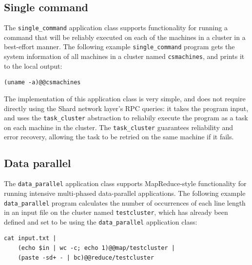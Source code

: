 \documentclass[oneside]{report}
\begin{document}
\subsection{Single command}

\begin{sloppypar}
  The \texttt{single\_command} application class supports functionality for running a command that will be reliably executed on each of the machines in a cluster in a best-effort manner. The following example \texttt{single\_command} program gets the system information of all machines in a cluster named \texttt{csmachines}, and prints it to the local output:
\end{sloppypar}

\begin{minipage}[c]{\textwidth-15pt}
  \begin{lstlisting}
(uname -a)@@csmachines 
\end{lstlisting}
  \smallskip
\end{minipage}

\begin{sloppypar}
  The implementation of this application class is very simple, and does not require directly using the Shard network layer's RPC queries: it takes the program input, and uses the \texttt{task\_cluster} abstraction to reliabily execute the program as a task on each machine in the cluster.
  The \texttt{task\_cluster} guarantees reliability and error recovery, allowing the task to be retried on the same machine if it fails.
\end{sloppypar}

\subsection{Data parallel}

The \texttt{data\_parallel} application class supports MapReduce-style functionality for running intensive multi-phased data-parallel applications.
The following example \texttt{data\_parallel} program calculates the number of occurrences of each line length in an input file on the cluster named \texttt{testcluster}, which has already been defined and set to be using the \texttt{data\_parallel} application class:

\begin{minipage}[c]{\textwidth-15pt}
  \begin{lstlisting}[language=shard]
cat input.txt |
    (echo $in | wc -c; echo 1)@@map/testcluster |
    (paste -sd+ - | bc)@@reduce/testcluster
\end{lstlisting}
  \smallskip
\end{minipage}
\end{document}
